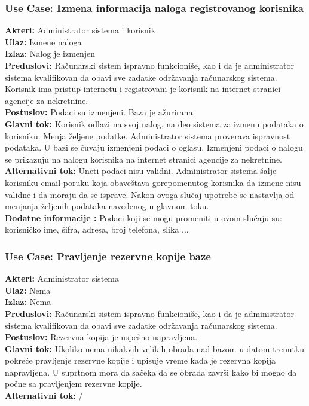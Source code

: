 \documentclass{article}
\begin{document}
\subsubsection{\bfseries Use Case: Izmena informacija naloga registrovanog korisnika}
{\bfseries Akteri:} Administrator sistema i korisnik\\
{\bfseries Ulaz:} Izmene naloga\\
{\bfseries Izlaz:} Nalog je izmenjen\\
{\bfseries Preduslovi:} Ra\v {c}unarski sistem ispravno funkcioni\v {s}e, kao i da je administrator sistema kvalifikovan da obavi sve zadatke odr\v {z}avanja ra\v {c}unarskog sistema. Korisnik ima pristup internetu i registrovani je korisnik na internet stranici agencije za nekretnine.\\
{\bfseries Postuslov:} Podaci su izmenjeni. Baza je a\v {z}urirana.\\
{\bfseries Glavni tok:} Korisnik odlazi na svoj nalog, na deo sistema za izmenu podataka o korisniku. Menja \v {z}eljene podatke. Administrator sistema proverava ispravnost podataka. U bazi se \v {c}uvaju izmenjeni podaci o oglasu. Izmenjeni podaci o nalogu se prikazuju na nalogu korisnika na internet stranici agencije za nekretnine.\\
{\bfseries Alternativni tok:} Uneti podaci nisu validni. Administrator sistema \v {s}alje korisniku email poruku koja obave\v {s}tava gorepomenutog korisnika da izmene nisu validne i da moraju da se isprave. Nakon ovoga slu\v {c}aj upotrebe se nastavlja od menjanja \v {z}eljenih podataka navedenog u glavnom toku.\\
{\bfseries Dodatne informacije :} Podaci koji se mogu promeniti u ovom slu\v {c}aju su: korisni\v {c}ko ime, \v {s}ifra, adresa, broj telefona, slika ...\\
\subsubsection{\bfseries Use Case: Pravljenje rezervne kopije baze}
{\bfseries Akteri:} Administrator sistema\\
{\bfseries Ulaz:} Nema\\
{\bfseries Izlaz:} Nema\\
{\bfseries Preduslovi:} Ra\v {c}unarski sistem ispravno funkcioni\v {s}e, kao i da je administrator sistema kvalifikovan da obavi sve zadatke odr\v {z}avanja ra\v {c}unarskog sistema.\\
{\bfseries Postuslov:} Rezervna kopija je uspe\v {s}no napravljena.\\
{\bfseries Glavni tok:} Ukoliko nema nikakvih velikih obrada nad bazom u datom trenutku pokre\' ce pravljenje rezervne kopije i upisuje vreme kada je rezervna kopija napravljena. U suprtnom mora da sa\v {c}eka da se obrada zavr\v {s}i kako bi mogao da po\v {c}ne sa pravljenjem rezervne kopije.\\
{\bfseries Alternativni tok:} /\\
\newpage
\end{document}
